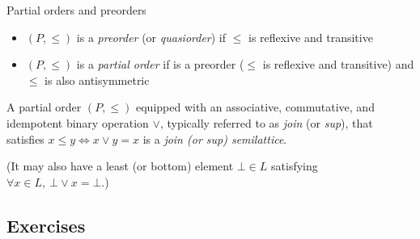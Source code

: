 \begin{definition} Partial orders and preorders
\begin{itemize}[noitemsep,topsep=0pt]
\item $(P, \leq)$ is a \emph{preorder} (or \emph{quasiorder}) if $\leq$ is
reflexive and transitive
\item $(P, \leq)$ is a \emph{partial order} if is a preorder ($\leq$ is
  reflexive and transitive) and $\leq$ is also antisymmetric
\end{itemize}
\end{definition}

\begin{definition}
A partial order $(P, \leq)$ equipped with an associative, commutative, and
idempotent binary operation $\lor$, typically referred to as \emph{join} (or
\emph{sup}), that satisfies $x \leq y \iff x \vee y = x$ is a \emph{join (or
sup) semilattice}.

(It may also have a least (or bottom) element $\bot \in L$ satisfying
$\forall x \in L,~\bot\lor x = \bot$.)
\end{definition}

\subsection{Exercises}

